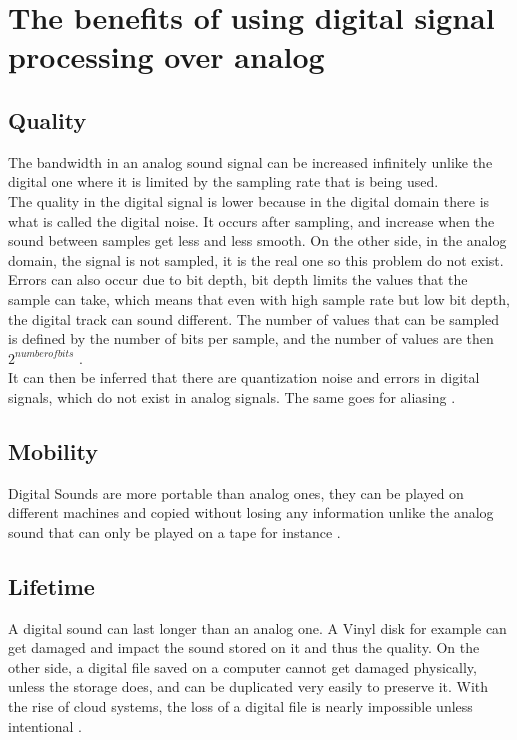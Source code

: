 \section{The benefits of using digital signal processing over analog}
\subsection{Quality}

The bandwidth in an analog sound signal can be increased infinitely unlike the digital one where it is limited by the sampling rate that is being used. \\

The quality in the digital signal is  lower because in the digital domain there is what is called the digital noise. It occurs after sampling, and increase when the sound between samples get less and less smooth. On the other side, in the analog domain, the signal is not sampled, it is the real one so this problem do not exist. Errors can also occur due to bit depth, bit depth limits the values that the sample can take, which means that even with high sample rate but low bit depth, the digital track can sound different. The number of values that can be sampled is defined by the number of bits per sample, and the number of values are then $2^{number of bits}$ \citep{analog_quality}.\\
It can then be inferred that there are quantization noise and errors in digital signals, which do not exist in analog signals. The same goes for aliasing \citep{analog_aliasing}. 

\subsection{Mobility}

Digital Sounds are more portable than analog ones, they can be played on different machines and copied without losing any information unlike the analog sound that can only be played on a tape for instance \citep{analog_quality}. 

\subsection{Lifetime}

A digital sound can last longer than an analog one. A Vinyl disk for example can get damaged and impact the sound stored on it and thus the quality. On the other side, a digital file saved on a computer cannot get damaged physically, unless the storage does, and can be duplicated very easily to preserve it. With the rise of cloud systems, the loss of a digital file is nearly impossible unless intentional \citep{analog_storage}.


